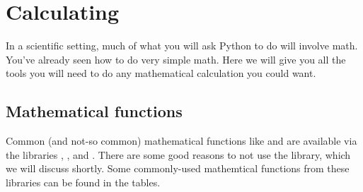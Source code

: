 \chapter{Calculating}
\label{chap:Calculating}
In a scientific setting, much of what you will ask Python to do will
involve math.  You've already seen how to do very simple math. Here we
will give you all the tools you will need to do any mathematical
calculation you could want.


\section{Mathematical functions}
 Common (and not-so common) mathematical functions like 
and  are available via the libraries ,
, and .  There are some good reasons to not
use the  library, which we will discuss shortly.  Some
commonly-used mathemtical functions from these libraries can be found
in the tables.

